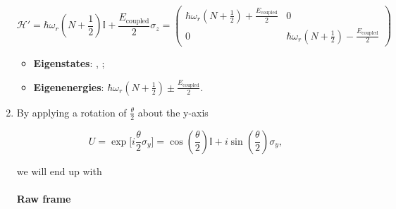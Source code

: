 \begin{enumerate}
\begin{framed}
    \[             \mathcal{H'}             =
      \hbar\omega_r(N+\frac{1}{2})\mathbb{I}
      +    \frac{E_\text{coupled}}{2}\sigma_z
      =                       \begin{pmatrix}
        \hbar\omega_r(N+\frac{1}{2})        +
        \frac{E_\text{coupled}}{2}   &  0\\0&
        \hbar\omega_r(N+\frac{1}{2})        -
        \frac{E_\text{coupled}}{2}
      \end{pmatrix}
    \]
    \begin{itemize}
    \item         \textbf{Eigenstates}:\hfill
      , ;
    \item    \textbf{Eigenenergies}:   \hfill
      $    \hbar\omega_r(N+\frac{1}{2})   \pm
      \frac{E_\text{coupled}}{2} $.
    \end{itemize}
  \end{framed}

\item    By    applying   a    rotation    of
  $ \frac{\theta}{2} $ about the y-axis

  \[
    U =  \exp\big[i\frac{\theta}{2}\sigma_y\big] =
    \cos(\frac{\theta}{2})\mathbb{I}             +
    i\sin(\frac{\theta}{2})\sigma_y,
  \]

  \noindent we will end up with

  \begin{framed}\noindent
    \paragraph{Raw frame}



\end{framed}
\end{enumerate}
